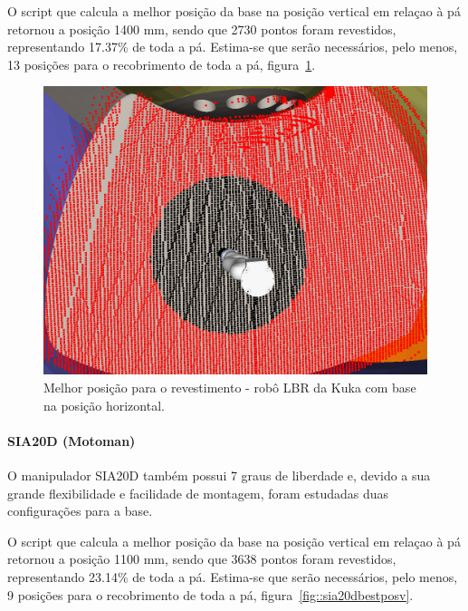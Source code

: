 O script que calcula a melhor posição da base na posição vertical em relaçao à
pá retornou a posição 1400 mm, sendo que 2730 pontos foram revestidos,
representando 17.37\% de toda a pá. Estima-se que serão necessários, pelo menos,
13 posições para o recobrimento de toda a pá, figura~\ref{fig::lbrbestposh}.

\begin{figure}[h!]	
	\includegraphics[width=\columnwidth]{detail/figs/bighatch/lbr_bestposh.png}
	\caption{Melhor posição para o revestimento - robô LBR da Kuka com base na
	posição horizontal.}
	\label{fig::lbrbestposh}
\end{figure}

\paragraph{SIA20D (Motoman)}
O manipulador SIA20D também possui 7 graus de liberdade e, devido a sua
grande flexibilidade e facilidade de montagem, foram estudadas duas
configurações para a base.

O script que calcula a melhor posição da base na posição vertical em relaçao à
pá retornou a posição 1100 mm, sendo que 3638 pontos foram revestidos,
representando 23.14\% de toda a pá. Estima-se que serão necessários, pelo menos,
9 posições para o recobrimento de toda a pá, figura~\ref{fig::sia20dbestposv}.

